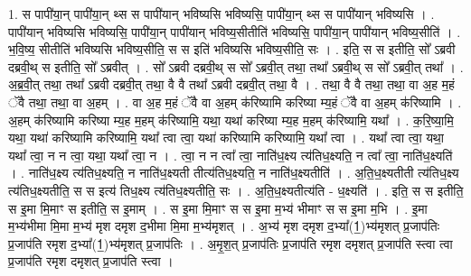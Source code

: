 \documentclass[17pt]{extarticle}
\begin{document}
1. स पापी॑या॒न् पापी॑या॒न् थ्स स पापी॑यान् भविष्यसि भविष्यसि॒ पापी॑या॒न् थ्स स पापी॑यान् भविष्यसि । . पापी॑यान् भविष्यसि भविष्यसि॒ पापी॑या॒न् पापी॑यान् भविष्य॒सीतीति॑ भविष्यसि॒ पापी॑या॒न् पापी॑यान् भविष्य॒सीति॑ । . भ॒वि॒ष्य॒ सीतीति॑ भविष्यसि भविष्य॒सीति॒ स स इति॑ भविष्यसि भविष्य॒सीति॒ सः । . इति॒ स स इतीति॒ सो᳚ ऽब्रवी दब्रवी॒थ् स इतीति॒ सो᳚ ऽब्रवीत् । . सो᳚ ऽब्रवी दब्रवी॒थ् स सो᳚ ऽब्रवी॒त् तथा॒ तथा᳚ ऽब्रवी॒थ् स सो᳚ ऽब्रवी॒त् तथा᳚ । . अ॒ब्र॒वी॒त् तथा॒ तथा᳚ ऽब्रवी दब्रवी॒त् तथा॒ वै वै तथा᳚ ऽब्रवी दब्रवी॒त् तथा॒ वै । . तथा॒ वै वै तथा॒ तथा॒ वा अ॒ह म॒हं ॅवै तथा॒ तथा॒ वा अ॒हम् । . वा अ॒ह म॒हं ॅवै वा अ॒हम् क॑रिष्यामि करिष्या म्य॒हं ॅवै वा अ॒हम् क॑रिष्यामि । . अ॒हम् क॑रिष्यामि करिष्या म्य॒ह म॒हम् क॑रिष्यामि॒ यथा॒ यथा॑ करिष्या म्य॒ह म॒हम् क॑रिष्यामि॒ यथा᳚ । . क॒रि॒ष्या॒मि॒ यथा॒ यथा॑ करिष्यामि करिष्यामि॒ यथा᳚ त्वा त्वा॒ यथा॑ करिष्यामि करिष्यामि॒ यथा᳚ त्वा । . यथा᳚ त्वा त्वा॒ यथा॒ यथा᳚ त्वा॒ न न त्वा॒ यथा॒ यथा᳚ त्वा॒ न । . त्वा॒ न न त्वा᳚ त्वा॒ नाति॑ध॒क्ष्य त्य॑तिध॒क्ष्यति॒ न त्वा᳚ त्वा॒ नाति॑ध॒क्ष्यति॑ । . नाति॑ध॒क्ष्य त्य॑तिध॒क्ष्यति॒ न नाति॑ध॒क्ष्यती तीत्य॑तिध॒क्ष्यति॒ न नाति॑ध॒क्ष्यतीति॑ । . अ॒ति॒ध॒क्ष्यतीती त्य॑तिध॒क्ष्य त्य॑तिध॒क्ष्यतीति॒ स स इत्य॑ तिध॒क्ष्य त्य॑तिध॒क्ष्यतीति॒ सः । . अ॒ति॒ध॒क्ष्यतीत्य॑ति - ध॒क्ष्यति॑ । . इति॒ स स इतीति॒ स इ॒मा मि॒माꣳ स इतीति॒ स इ॒माम् । . स इ॒मा मि॒माꣳ स स इ॒मा म॒भ्य॑ भीमाꣳ स स इ॒मा म॒भि । . इ॒मा म॒भ्य॑भीमा मि॒मा म॒भ्य॑ मृश दमृश द॒भीमा मि॒मा म॒भ्य॑मृशत् । . अ॒भ्य॑ मृश दमृश द॒भ्या᳚(1॒)भ्य॑मृशत् प्र॒जाप॑तिः प्र॒जाप॑ति रमृश द॒भ्या᳚(1॒)भ्य॑मृशत् प्र॒जाप॑तिः । . अ॒मृ॒श॒त् प्र॒जाप॑तिः प्र॒जाप॑ति रमृश दमृशत् प्र॒जाप॑ति स्त्वा त्वा प्र॒जाप॑ति रमृश दमृशत् प्र॒जाप॑ति स्त्वा । \newline
\end{document}
